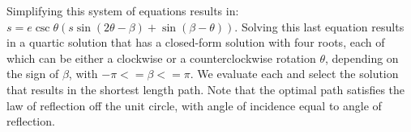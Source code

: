  Simplifying this system of equations results in: $s=e \csc \theta (s \sin(2 \theta-\beta)+\sin(\beta-\theta))$. Solving this last equation results in a quartic solution that has a closed-form solution with four roots, each of which can be either a clockwise or a counterclockwise rotation $\theta$, depending on the sign of $\beta$, with $-\pi<=\beta<=\pi$. We evaluate each and select the solution that results in the shortest length path. Note that the optimal path satisfies the law of reflection off the unit circle, with angle of incidence equal to angle of reflection.
 
  
 